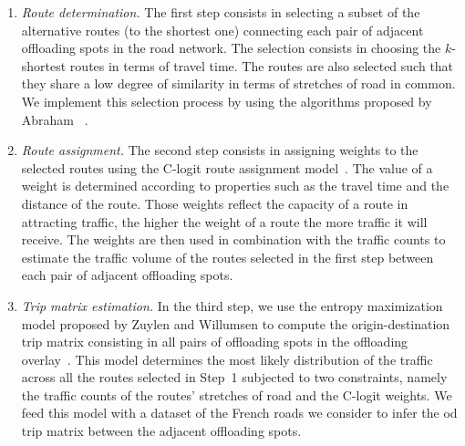 \begin{enumerate}

    \item \textit{Route determination.} The first step consists in selecting a subset of the alternative routes (to the shortest one) connecting each pair of adjacent offloading spots in the road network. The selection consists in choosing the $k$-shortest routes in terms of travel time. The routes are also selected such that they share a low degree of similarity in terms of stretches of road in common. We implement this selection process by using the algorithms proposed by Abraham \etal~\cite{abraham2013alternative}.

    \item \textit{Route assignment.} The second step consists in assigning weights to the selected routes using the C-logit route assignment model~\cite{cascetta1996modified}. The value of a weight is determined according to properties such as the travel time and the distance of the route. Those weights reflect the capacity of a route in attracting traffic, the higher the weight of a route the more traffic it will receive. The weights are then used in combination with the traffic counts to estimate the traffic volume of the routes selected in the first step between each pair of adjacent offloading spots. 
    
    \item \textit{Trip matrix estimation.} In the third step, we use the entropy maximization model proposed by Zuylen and Willumsen to compute the origin-destination trip matrix consisting in all pairs of offloading spots in the offloading overlay~\cite{van1980most}. This model determines the most likely distribution of the traffic across all the routes selected in Step~1 subjected to two constraints, namely the traffic counts of the routes' stretches of road and the C-logit weights. We feed this model with a dataset of the French roads we consider to infer the \acrshort{od} trip matrix between the adjacent offloading spots. 
    
\end{enumerate}

